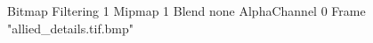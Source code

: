 {Bitmap
	{Filtering 1}
	{Mipmap 1}
	{Blend none}
	{AlphaChannel 0}
	{Frame "allied_details.tif.bmp"}
}
